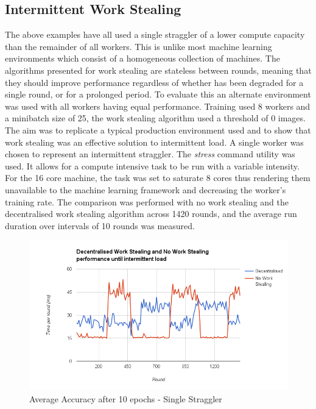 \documentclass[12pt]{article}
\begin{document}
\subsection{Intermittent Work Stealing}

The above examples have all used a single straggler of a lower compute capacity than the remainder of all workers. This is unlike most machine learning environments which consist of a homogeneous collection of machines. The algorithms presented for work stealing are stateless between rounds, meaning that they should improve performance regardless of whether has been degraded for a single round, or for a prolonged period.
\newline
\newline
To evaluate this an alternate environment was used with all workers having equal performance. Training used 8 workers and a minibatch size of 25, the work stealing algorithm used a threshold of 0 images. The aim was to replicate a typical production environment used and to show that work stealing was an effective solution to intermittent load. A single worker was chosen to represent an intermittent straggler. The \textit{stress} command utility was used. It allows for a compute intensive task to be run with a variable intensity. For the 16 core machine, the task was set to saturate 8 cores thus rendering them unavailable to the machine learning framework and decreasing the worker's training rate. The comparison was performed with no work stealing and the decentralised work stealing algorithm across 1420 rounds, and the average run duration over intervals of 10 rounds was measured.

 \begin{figure}[H]
  \centering
  \includegraphics[width=6in]{DecentralisedVsNo}
  \caption[]{Average Accuracy after 10 epochs - Single Straggler}
  \label{DecentralisedVsNo}
\end{figure}
\end{document}
